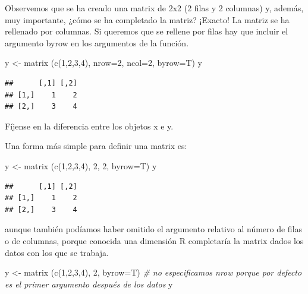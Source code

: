 \documentclass[
]{book}
\newenvironment{Shaded}{\begin{snugshade}}{\end{snugshade}}
\newcommand{\AttributeTok}[1]{\textcolor[rgb]{0.77,0.63,0.00}{#1}}
\newcommand{\CommentTok}[1]{\textcolor[rgb]{0.56,0.35,0.01}{\textit{#1}}}
\newcommand{\DecValTok}[1]{\textcolor[rgb]{0.00,0.00,0.81}{#1}}
\newcommand{\FunctionTok}[1]{\textcolor[rgb]{0.00,0.00,0.00}{#1}}
\newcommand{\NormalTok}[1]{#1}
\newcommand{\OtherTok}[1]{\textcolor[rgb]{0.56,0.35,0.01}{#1}}
\begin{document}
Observemos que se ha creado una matrix de 2x2 (2 filas y 2 columnas) y, además, muy importante, ¿cómo se ha completado la matriz? ¡Exacto! La matriz se ha rellenado por columnas. Si queremos que se rellene por filas hay que incluir el argumento byrow en los argumentos de la función.

\begin{Shaded}
\begin{Highlighting}[]
\NormalTok{y }\OtherTok{\textless{}{-}} \FunctionTok{matrix}\NormalTok{ (}\FunctionTok{c}\NormalTok{(}\DecValTok{1}\NormalTok{,}\DecValTok{2}\NormalTok{,}\DecValTok{3}\NormalTok{,}\DecValTok{4}\NormalTok{), }\AttributeTok{nrow=}\DecValTok{2}\NormalTok{, }\AttributeTok{ncol=}\DecValTok{2}\NormalTok{, }\AttributeTok{byrow=}\NormalTok{T)}
\NormalTok{y}
\end{Highlighting}
\end{Shaded}

\begin{verbatim}
##      [,1] [,2]
## [1,]    1    2
## [2,]    3    4
\end{verbatim}

Fíjense en la diferencia entre los objetos x e y.

Una forma más simple para definir una matrix es:

\begin{Shaded}
\begin{Highlighting}[]
\NormalTok{y }\OtherTok{\textless{}{-}} \FunctionTok{matrix}\NormalTok{ (}\FunctionTok{c}\NormalTok{(}\DecValTok{1}\NormalTok{,}\DecValTok{2}\NormalTok{,}\DecValTok{3}\NormalTok{,}\DecValTok{4}\NormalTok{), }\DecValTok{2}\NormalTok{, }\DecValTok{2}\NormalTok{, }\AttributeTok{byrow=}\NormalTok{T)}
\NormalTok{y}
\end{Highlighting}
\end{Shaded}

\begin{verbatim}
##      [,1] [,2]
## [1,]    1    2
## [2,]    3    4
\end{verbatim}

aunque también podíamos haber omitido el argumento relativo al número de filas o de columnas, porque conocida una dimensión R completaría la matrix dados los datos con los que se trabaja.

\begin{Shaded}
\begin{Highlighting}[]
\NormalTok{y }\OtherTok{\textless{}{-}} \FunctionTok{matrix}\NormalTok{ (}\FunctionTok{c}\NormalTok{(}\DecValTok{1}\NormalTok{,}\DecValTok{2}\NormalTok{,}\DecValTok{3}\NormalTok{,}\DecValTok{4}\NormalTok{), }\DecValTok{2}\NormalTok{, }\AttributeTok{byrow=}\NormalTok{T)  }\CommentTok{\# no especificamos nrow porque por defecto es el primer argumento después de los datos}
\NormalTok{y}
\end{Highlighting}
\end{Shaded}
\end{document}
